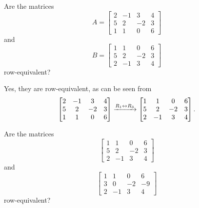 \documentclass{ximera}
\begin{document}
\begin{example}
  Are the matrices
  \[
    A=\begin{bmatrix}
      2&-1&3&4\\
      5&2&-2&3\\
      1&1&0&6
    \end{bmatrix}
  \]
  and
  \[
    B=\begin{bmatrix}
      1&1&0&6\\
      5&2&-2&3\\
      2&-1&3&4
    \end{bmatrix}
  \]
  row-equivalent?
  
  \begin{multipleChoice}
  \end{multipleChoice}
  
  \begin{feedback}
    Yes, they are row-equivalent, as can be seen from
    \[
      \begin{bmatrix}
        2&-1&3&4\\
        5&2&-2&3\\
        1&1&0&6
      \end{bmatrix}
      \xrightarrow{R_{1}\leftrightarrow R_{3}}
      \begin{bmatrix}
        1&1&0&6\\
        5&2&-2&3\\
        2&-1&3&4
      \end{bmatrix}.
    \]
  \end{feedback}

  \begin{question}
    Are the matrices
    \[
      \begin{bmatrix}
        1&1&0&6\\
        5&2&-2&3\\
        2&-1&3&4
      \end{bmatrix}
    \]
    and
    \[
      \begin{bmatrix}
        1&1&0&6\\
        3&0&-2&-9\\
        2&-1&3&4
      \end{bmatrix}
    \]
    row-equivalent?
    
    \begin{multipleChoice}
    \end{multipleChoice}
    

\end{question}
\end{example}
\end{document}
